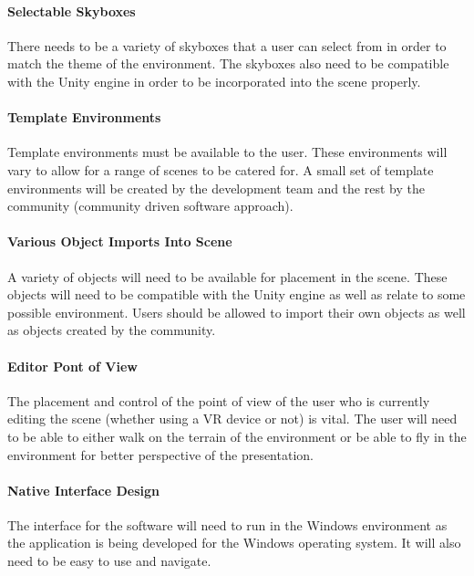 		\paragraph{Selectable Skyboxes}

		There needs to be a variety of skyboxes that a user can select from in order to match the theme of the environment.
		The skyboxes also need to be compatible with the Unity engine in order to be incorporated into the scene properly.

		\paragraph{Template Environments}

		Template environments must be available to the user.
		These environments will vary to allow for a range of scenes to be catered for.
		A small set of template environments will be created by the development team and the rest by the community (community driven software approach).

		\paragraph{Various Object Imports Into Scene}

		A variety of objects will need to be available for placement in the scene.
		These objects will need to be compatible with the Unity engine as well as relate to some possible environment.
	  Users should be allowed to import their own objects as well as objects created by the community.

		\paragraph{Editor Pont of View}

		The placement and control of the point of view of the user who is currently editing the scene (whether using a VR device or not) is vital.
		The user will need to be able to either walk on the terrain of the environment or be able to fly in the environment for better perspective of the presentation.

		\paragraph{Native Interface Design}

		The interface for the software will need to run in the Windows environment as the application is being developed for the Windows operating system.
		It will also need to be easy to use and navigate.

